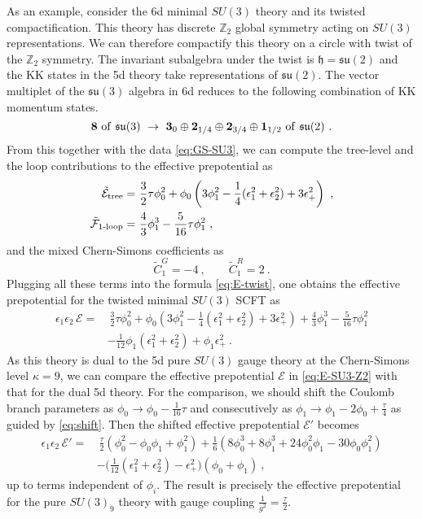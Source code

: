 As an example, consider the 6d minimal $SU(3)$ theory and its twisted compactification. This theory has discrete $\mathbb{Z}_2$ global symmetry acting on $SU(3)$ representations. We can therefore compactify this theory on a circle with twist of the $\mathbb{Z}_2$ symmetry. The invariant subalgebra under the twist is $\mathfrak{h}=\mathfrak{su}(2)$ and the KK states in the 5d theory take representations of $\mathfrak{su}(2)$. The vector multiplet of the $\mathfrak{su}(3)$ algebra in 6d reduces to the following combination of KK momentum states.
\begin{equation}
	{\bf 8} \ {\rm of} \ \mathfrak{su}(3) \ \rightarrow \ {\bf 3}_0 \oplus {\bf 2}_{1/4} \oplus {\bf 2}_{3/4} \oplus {\bf 1}_{1/2} \ {\rm of} \ \mathfrak{su}(2) \ .
\end{equation}
From this together with the data \eqref{eq:GS-SU3}, we can compute the tree-level and the loop contributions to the effective prepotential as
\begin{align}
	\tilde{\mathcal{E}}_{\rm tree} =~& \frac{3}{2}\tau \phi_0^2 +\phi_0\left(3\phi_1^2 -\frac{1}{4}(\epsilon_1^2+\epsilon_2^2) + 3\epsilon_+^2\right) \ , \nonumber \\
	\tilde{\mathcal{F}}_{\text{1-loop}} = ~&\frac{4}{3}\phi_1^3 -\frac{5}{16}\tau \phi_1^2 \ ,
\end{align}
and the mixed Chern-Simons coefficients as
\begin{equation}
	\tilde{C}^G_1 = -4 \ , \qquad \tilde{C}^R_1 = 2 \ .
\end{equation}
Plugging all these terms into the formula \eqref{eq:E-twist}, one obtains the effective prepotential for the twisted minimal $SU(3)$ SCFT as
\begin{align}\label{eq:E-SU3-Z2}
	\epsilon_1\epsilon_2\, \mathcal{E} = &~\frac{3}{2}\tau \phi_0^2 +\phi_0\left(3\phi_1^2 -\frac{1}{4}(\epsilon_1^2+\epsilon_2^2) + 3\epsilon_+^2\right)+\frac{4}{3}\phi_1^3 -\frac{5}{16}\tau \phi_1^2 \nonumber \\
	&-\frac{1}{12}\phi_1(\epsilon_1^2+\epsilon_2^2)+\phi_1\epsilon_+^2 \ .
\end{align}
As this theory is dual to the 5d pure $SU(3)$ gauge theory at the Chern-Simons level $\kappa=9$, we can compare the effective prepotential $\mathcal{E}$ in \eqref{eq:E-SU3-Z2} with that for the dual 5d theory. For the comparison, we should shift the Coulomb branch parameters as $\phi_0 \rightarrow \phi_0 -\frac{1}{16}\tau$ and consecutively as $\phi_1 \rightarrow \phi_1 - 2\phi_0+\frac{\tau}{4}$ as guided by \eqref{eq:shift}. Then the shifted effective prepotential $\mathcal{E}'$ becomes
\begin{align}
\epsilon_1\epsilon_2\, \mathcal{E}' =&~ \frac{\tau}{2}(\phi_0^2-\phi_0\phi_1+\phi_1^2)
+\frac{1}{6}\left(8\phi_0^3+8\phi_1^3 +24\phi_0^2\phi_1 - 30\phi_0\phi_1^2\right) \nonumber \\
& -\Big(\frac{1}{12}(\epsilon_1^2+\epsilon_2^2)-\epsilon_+^2 \Big) (\phi_0+\phi_1) \ ,
\end{align}
up to terms independent of $\phi_i$. The result is precisely the effective prepotential for the pure $SU(3)_9$ theory with gauge coupling $\frac{1}{g^2} = \tfrac{\tau}{2}$.